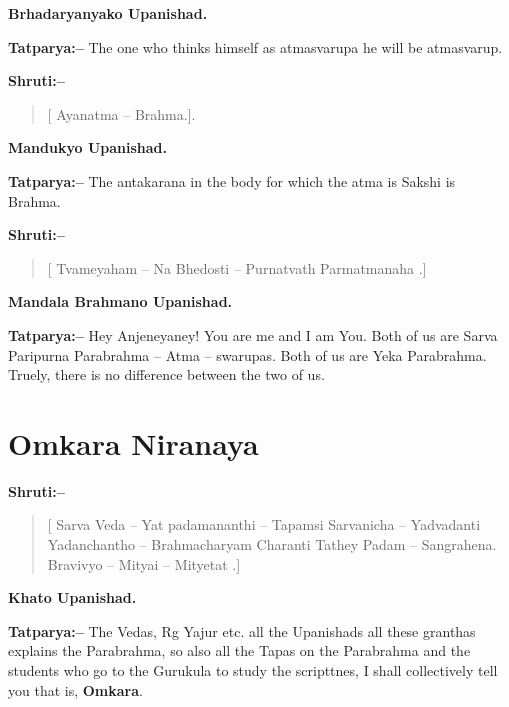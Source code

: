\begin{flushright}
\textbf{Brhadaryanyako Upanishad.}
\end{flushright}

\textbf{Tatparya:–} The one who thinks himself as atmasvarupa he will be atmasvarup.

\textbf{Shruti:–}

\begin{verse}
[ Ayanatma – Brahma.].
\end{verse}

\begin{flushright}
\textbf{Mandukyo Upanishad.}
\end{flushright}

\textbf{Tatparya:–} The antakarana in the body for which the atma is Sakshi is Brahma.

\textbf{Shruti:–}

\begin{verse}
[ Tvameyaham – Na Bhedosti – Purnatvath Parmatmanaha .]
\end{verse}

\begin{flushright}
\textbf{Mandala Brahmano Upanishad.}
\end{flushright}

\textbf{Tatparya:–} Hey Anjeneyaney! You are me and I am You. Both of us are Sarva Paripurna Parabrahma – Atma – swarupas. Both of us are Yeka Parabrahma. Truely, there is no difference between the two of us.

\chapter{Omkara Niranaya}

\textbf{Shruti:–}

\begin{verse}
[ Sarva Veda – Yat padamananthi  – Tapamsi Sarvanicha – Yadvadanti  Yadanchantho – Brahmacharyam Charanti  Tathey Padam – Sangrahena. Bravivyo – Mityai – Mityetat .]
\end{verse}

\begin{flushright}
\textbf{Khato Upanishad.}
\end{flushright}

\textbf{Tatparya:–} The Vedas, Rg Yajur etc. all the Upanishads all these granthas explains the Parabrahma, so also all the Tapas on the Parabrahma and the students who go to the Gurukula to study the scripttnes, I shall collectively tell you that is, \textbf{Omkara}.

